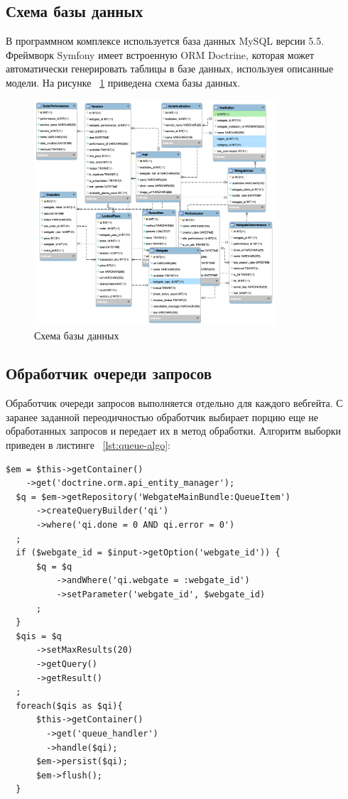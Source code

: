 \subsection{Схема базы данных}

В программном комплексе используется база данных MySQL версии 5.5. Фреймворк Symfony имеет встроенную ORM Doctrine, которая может автоматически генерировать таблицы в базе данных, используея описанные модели. На рисунке ~\ref{fig:db-schema} приведена схема базы данных.

\begin{figure}[H]
  	\centering
 	\includegraphics[width=0.8\textwidth]{images/db-schema.png}
  	\caption{Схема базы данных}
    \label{fig:db-schema}
\end{figure}

\subsection{Обработчик очереди запросов}

Обработчик очереди запросов выполняется отдельно для каждого вебгейта. С заранее заданной переодичностью обработчик выбирает порцию еще не обработанных запросов и передает их в метод обработки. Алгоритм выборки приведен в листинге ~\ref{lst:queue-algo}:

\begin{lstlisting}[caption={Алгоритм выборки запросов из очереди}, label=lst:queue-algo]
  $em = $this->getContainer()
    ->get('doctrine.orm.api_entity_manager');
  $q = $em->getRepository('WebgateMainBundle:QueueItem')
      ->createQueryBuilder('qi')
      ->where('qi.done = 0 AND qi.error = 0')
  ;
  if ($webgate_id = $input->getOption('webgate_id')) {
      $q = $q
          ->andWhere('qi.webgate = :webgate_id')
          ->setParameter('webgate_id', $webgate_id)
      ;
  }
  $qis = $q
      ->setMaxResults(20)
      ->getQuery()
      ->getResult()
  ;
  foreach($qis as $qi){
      $this->getContainer()
        ->get('queue_handler')
        ->handle($qi);
      $em->persist($qi);
      $em->flush();
  }
\end{lstlisting}


